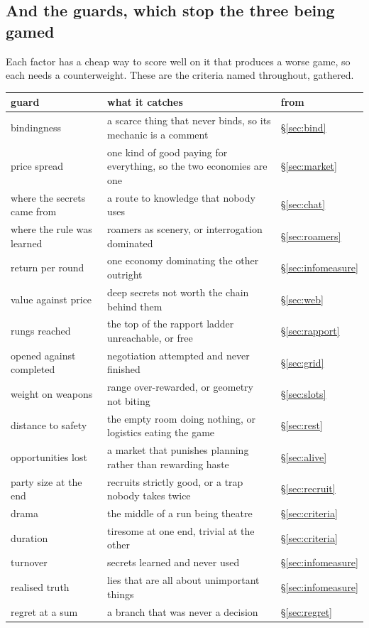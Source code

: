 \documentclass[11pt,a4paper]{article}
\begin{document}
\subsection{And the guards, which stop the three being gamed}

Each factor has a cheap way to score well on it that produces a worse game, so each needs a
counterweight. These are the criteria named throughout, gathered.

\small
\begin{center}
\begin{tabular}{@{}l@{\hspace{3mm}}>{\raggedright\arraybackslash}p{}@{\hspace{3mm}}>{\raggedright\arraybackslash}p{}@{}}
\toprule
\textbf{guard} & \textbf{what it catches} & \textbf{from} \\
\midrule
bindingness      & a scarce thing that never binds, so its mechanic is a comment & \S\ref{sec:bind} \\
price spread     & one kind of good paying for everything, so the two economies are one & \S\ref{sec:market} \\
where the secrets came from & a route to knowledge that nobody uses & \S\ref{sec:chat} \\
where the rule was learned & roamers as scenery, or interrogation dominated & \S\ref{sec:roamers} \\
return per round & one economy dominating the other outright & \S\ref{sec:infomeasure} \\
value against price & deep secrets not worth the chain behind them & \S\ref{sec:web} \\
rungs reached    & the top of the rapport ladder unreachable, or free & \S\ref{sec:rapport} \\
opened against completed & negotiation attempted and never finished & \S\ref{sec:grid} \\
weight on weapons & range over-rewarded, or geometry not biting & \S\ref{sec:slots} \\
distance to safety & the empty room doing nothing, or logistics eating the game & \S\ref{sec:rest} \\
opportunities lost & a market that punishes planning rather than rewarding haste & \S\ref{sec:alive} \\
party size at the end & recruits strictly good, or a trap nobody takes twice & \S\ref{sec:recruit} \\
drama            & the middle of a run being theatre & \S\ref{sec:criteria} \\
duration         & tiresome at one end, trivial at the other & \S\ref{sec:criteria} \\
turnover         & secrets learned and never used & \S\ref{sec:infomeasure} \\
realised truth   & lies that are all about unimportant things & \S\ref{sec:infomeasure} \\
regret at a sum  & a branch that was never a decision & \S\ref{sec:regret} \\
\bottomrule
\end{tabular}
\end{center}
\normalsize
\end{document}
